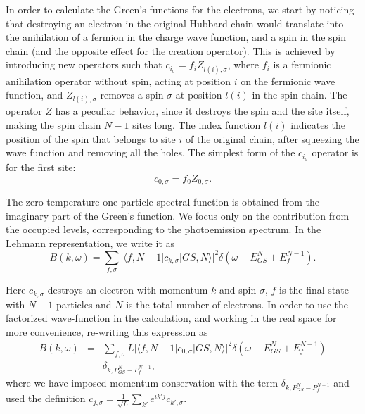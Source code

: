 \documentclass[article,11pt]{revtex4}
\begin{document}
In order to calculate the Green's functions for the electrons, we start by noticing that destroying an electron in the original Hubbard chain would translate into the anihilation of a fermion in the charge wave function, and a spin in the spin chain (and the opposite effect for the creation operator). This is achieved by introducing new operators such that $c_{i_\sigma}=f_iZ_{l(i),\sigma}$, where $f_i$ is a fermionic anihilation operator without spin, acting at position $i$ on the fermionic wave function, and $Z_{l(i),\sigma}$ removes a spin $\sigma$ at position $l(i)$ in the spin chain. The operator $Z$ has a peculiar behavior, since it destroys the spin and the site itself, making the spin chain $N-1$ sites long. The index function $l(i)$ indicates the position of the spin that belongs to site $i$ of the original chain, after squeezing the wave function and removing all the holes. The simplest form of the $c_{i_\sigma}$ operator is for the first site:
\begin{equation}
c_{0,\sigma} = f_0 Z_{0,\sigma}.
\label{c_}
\end{equation}

The zero-temperature one-particle spectral function is obtained from the imaginary part of the Green's function. We focus only on the contribution from the occupied levels, corresponding to the photoemission spectrum.  In the Lehmann representation, we write it as
\begin{equation}
B(k,\omega)= \sum_{f,\sigma} |\langle f,N-1 | c_{k,\sigma} | GS,N \rangle |^2 \delta (\omega - E_{GS}^N + E_f ^{N-1}).
\label{B_ck}
\end{equation}

Here $c_{k,\sigma}$ destroys an electron with momentum $k$ and spin $\sigma$, $f$ is the final state with $N-1$ particles and $N$ is the total number of electrons. In order to use the factorized wave-function in the calculation, and working in the real space for more convenience, re-writing this expression as
\begin{eqnarray}
B(k,\omega) & = & \sum_{f,\sigma} L |\langle f,N-1 | c_{0,\sigma} | GS,N \rangle |^2 \delta (\omega - E_{GS}^N + E_f ^{N-1}) \nonumber \\
& & \delta_{k,P_{GS}^N-P_f^{N-1}} ,
\label{B_c0}
\end{eqnarray}
where we have imposed momentum conservation with the term $\delta_{k,P_{GS}^N-P_f^{N-1}}$ and used the definition $c_{j,{\sigma}}=\frac{1}{\sqrt{L}} \sum_{k'} e^{i k' j} c_{k',\sigma}$.  
\end{document}
